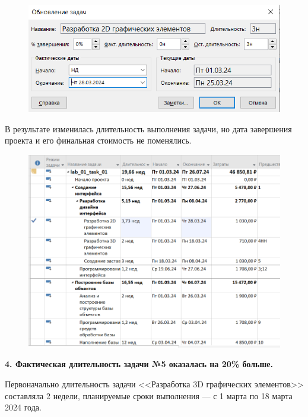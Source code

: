 \begin{figure}[h!]
	\begin{center}
		\includegraphics[scale=0.65]{inc/img/p_12.png}
	\end{center}
	\captionsetup{justification=centering}
	\label{fig:u3}
\end{figure}

В результате изменилась длительность выполнения задачи, но дата завершения проекта и его финальная стоимость не поменялись.

\begin{figure}[h!]
	\begin{center}
		\includegraphics[scale=0.6]{inc/img/p_13.png}
	\end{center}
	\captionsetup{justification=centering}
	\label{fig:u3}
\end{figure}

\newpage

\textbf{4. Фактическая длительность задачи №5 оказалась на 20\% больше.}

Первоначально длительность задачи <<Разработка 3D графических элементов>> составляла 2 недели, планируемые сроки выполнения --- с 1 марта по 18 марта 2024 года.

